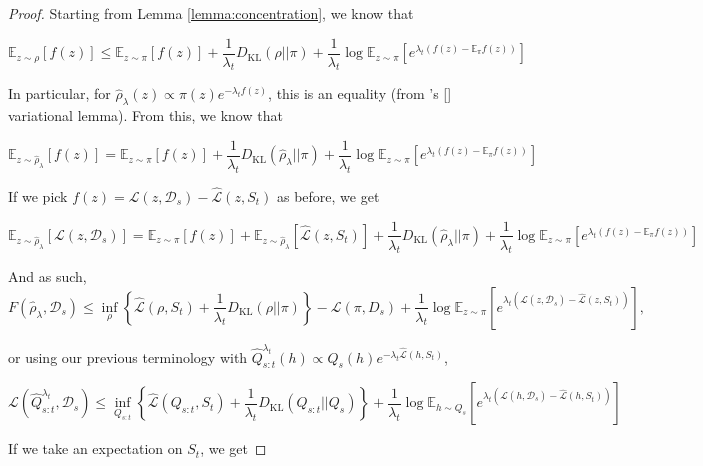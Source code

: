 \documentclass{article}
\theoremstyle{plain}
\theoremstyle{definition}
\theoremstyle{remark}
\begin{document}
\begin{proof}
Starting from Lemma \ref{lemma:concentration}, we know that 

$$\mathbb{E}_{z\sim \rho}\left [f(z) \right ]\leq \mathbb{E}_{z\sim \pi}\left [f(z) \right ]+ \frac{1}{\lambda_t}D_{\mathrm{KL}}(\rho||\pi)+ \frac{1}{\lambda_t}\log\mathbb{E}_{z\sim \pi}\left [e^{\lambda_t(f(z)-\mathbb{E}_\pi f(z))} \right ]$$

In particular, for $\hat{\rho}_\lambda(z)\propto \pi(z) e^{-\lambda_t f(z) }$, this is an equality (from \citeauthor{donsker1975large}'s [\citeyear{donsker1975large}] variational lemma).
From this, we know that

\begin{equation}
\mathbb{E}_{z\sim \hat{\rho}_\lambda}\left [f(z) \right ]= \mathbb{E}_{z\sim \pi}\left [f(z) \right ]+ \frac{1}{\lambda_t}D_{\mathrm{KL}}(\hat{\rho}_\lambda||\pi)+ \frac{1}{\lambda_t}\log\mathbb{E}_{z\sim \pi}\left [e^{\lambda_t(f(z)-\mathbb{E}_\pi f(z))} \right ]
\end{equation}

If we pick $f(z)=\mathcal{L}(z,\mathcal{D}_s)-\hat{\mathcal{L}}(z,S_t)$ as before, we get

$$\mathbb{E}_{z\sim \hat{\rho}_\lambda}\left [\mathcal{L}(z,\mathcal{D}_s) \right ]= \mathbb{E}_{z\sim \pi}\left [f(z) \right ]+\mathbb{E}_{z\sim \hat{\rho}_\lambda}\left [\hat{\mathcal{L}}(z,S_t) \right ]+ \frac{1}{\lambda_t}D_{\mathrm{KL}}(\hat{\rho}_\lambda||\pi)+ \frac{1}{\lambda_t}\log\mathbb{E}_{z\sim \pi}\left [e^{\lambda_t(f(z)-\mathbb{E}_\pi f(z))} \right ]$$

And as such,
$$F( \hat{\rho}_\lambda,\mathcal{D}_s)\leq \inf_{\rho}\left \{ \hat{\mathcal{L}}(\rho,S_t) + \frac{1}{\lambda_t}D_{\mathrm{KL}}(\rho||\pi)  \right \}-\mathcal{L}(\pi,D_s)+\frac{1}{\lambda_t}\log\mathbb{E}_{z\sim \pi}\left [e^{\lambda_t(\mathcal{L}(z,\mathcal{D}_s)-\hat{\mathcal{L}}(z,S_t))} \right ],$$

or using our previous terminology with $\hat{Q}^{\lambda_t}_{s:t}(h)\propto Q_s(h)e^{-\lambda_t\hat{\mathcal{L}}(h,S_t)}$, 

$$\mathcal{L}( \hat{Q}^{\lambda_t}_{s:t},\mathcal{D}_s)\leq \inf_{Q_{s:t}}\left \{ \hat{\mathcal{L}}(Q_{s:t},S_t) + \frac{1}{\lambda_t}D_{\mathrm{KL}}(Q_{s:t}||Q_{s}) \right \}+\frac{1}{\lambda_t}\log\mathbb{E}_{h\sim Q_s}\left [e^{\lambda_t(\mathcal{L}(h,\mathcal{D}_s)-\hat{\mathcal{L}}(h,S_t))} \right ]$$

If we take an expectation on $S_t$, we get


\end{proof}
\end{document}
